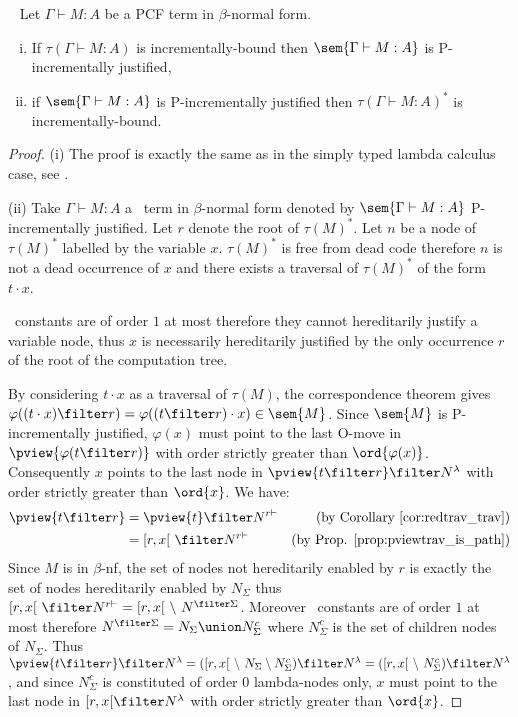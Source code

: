 \begin{proposition} \
\label{prop:incrbound_imp_incrjustified_pcf} Let $\Gamma \vdash M : A$ be a PCF term in $\beta$-normal form.
\begin{enumerate}[(i)]
\item  If $\tau(\Gamma \vdash M : A)$ is incrementally-bound then $\sem{\Gamma \vdash M : A}$ is P-incrementally justified,
\item  if $\sem{\Gamma \vdash M : A}$ is P-incrementally justified
then $\tau(\Gamma \vdash M : A)^*$ is incrementally-bound.
\end{enumerate}
\end{proposition}
\begin{proof}
(i) The proof is exactly the same as in the simply typed lambda calculus case,
see \cite[Proposition 4.1.5(i)]{blumtransfer}.

\noindent (ii)
Take $\Gamma \vdash M : A$ a \pcf\ term in $\beta$-normal form denoted by $\sem{\Gamma \vdash M : A}$ P-incrementally justified. Let $r$ denote the root of $\tau(M)^*$.
Let $n$ be a node of $\tau(M)^*$ labelled by the variable $x$.
$\tau(M)^*$ is free from dead code therefore $n$ is not a dead occurrence of $x$ and there exists a traversal of $\tau(M)^*$ of the form $t \cdot x$.

\pcf\ constants are of order $1$ at most therefore they cannot
hereditarily justify a variable node, thus $x$ is necessarily
hereditarily justified by the only occurrence $r$ of the root of the
computation tree.

By considering $t\cdot x$ as a traversal of $\tau(M)$,  the
correspondence theorem gives $\varphi((t \cdot x) \filter r) =
\varphi((t \filter r) \cdot x) \in \sem{M}$. Since $\sem{M}$ is
P-incrementally justified, $\varphi(x)$ must point to the last
O-move in $\pview{\varphi(t \filter r)}$ with order strictly greater
than $\ord{\varphi(x)}$. Consequently $x$ points to the last node in
$\pview{t \filter r} \filter N^{\lambda}$ with order strictly
greater than $\ord{x}$. We have:
\begin{align*}
\pview{t \filter r} &= \pview{t} \filter N^{r \vdash} & (\mbox{by Corollary \ref{cor:redtrav_trav}}) \\
& = [r,x[ \ \filter N^{r \vdash} & (\mbox{by Prop. \ref{prop:pviewtrav_is_path}})
\end{align*}
Since $M$ is in $\beta$-nf, the set of nodes not hereditarily
enabled by $r$ is exactly the set of nodes hereditarily enabled by
$N_{\Sigma}$ thus $[r,x[ \ \filter N^{r \vdash} = [r,x[\ \setminus\
N^{\filter \Sigma}$. Moreover \pcf\ constants are of order $1$ at
most therefore $N^{\filter \Sigma} = N_{\Sigma} \union N^c_{\Sigma}$
where $N^c_{\Sigma}$ is the set of children nodes of $N_{\Sigma}$.
Thus $\pview{t \filter r} \filter N^{\lambda} = ([r,x[\ \setminus\
N_{\Sigma} \setminus N^c_{\Sigma} ) \filter N^{\lambda} = ([r,x[\
\setminus\  N^c_{\Sigma} )  \filter N^{\lambda}$, and since
$N^c_{\Sigma}$ is constituted of order $0$ lambda-nodes only, $x$
must point to the last node in $[r,x[ \filter N^{\lambda}$ with
order strictly greater than $\ord{x}$.


\end{proof}
